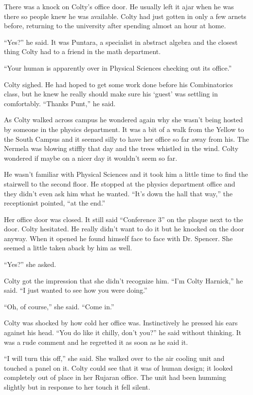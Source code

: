 
There was a knock on Colty's office door. He usually left it ajar when he was there so people
knew he was available. Colty had just gotten in only a few arnets before, returning to the
university after spending almost an hour at home.

``Yes?'' he said. It was Puntara, a specialist in abstract algebra and the closest thing Colty
had to a friend in the math department.

``Your human is apparently over in Physical Sciences checking out its office.''

Colty sighed. He had hoped to get some work done before his Combinatorics class, but he knew he
really should make sure his `guest' was settling in comfortably. ``Thanks Punt,'' he said.

As Colty walked across campus he wondered again why she wasn't being hosted by someone in the
physics department. It was a bit of a walk from the Yellow to the South Campus and it seemed
silly to have her office so far away from his. The Nermela was blowing stiffly that day and the
trees whistled in the wind. Colty wondered if maybe on a nicer day it wouldn't seem so far.

He wasn't familiar with Physical Sciences and it took him a little time to find the stairwell to
the second floor. He stopped at the physics department office and they didn't even ask him what
he wanted. ``It's down the hall that way,'' the receptionist pointed, ``at the end.''

Her office door was closed. It still said ``Conference 3'' on the plaque next to the door. Colty
hesitated. He really didn't want to do it but he knocked on the door anyway. When it opened he
found himself face to face with Dr. Spencer. She seemed a little taken aback by him as well.

``Yes?'' she asked.

Colty got the impression that she didn't recognize him. ``I'm Colty Harnick,'' he said. ``I just
wanted to see how you were doing.''

``Oh, of course,'' she said. ``Come in.''

Colty was shocked by how cold her office was. Instinctively he pressed his ears against his
head. ``You do like it chilly, don't you?'' he said without thinking. It was a rude comment and
he regretted it as soon as he said it.

``I will turn this off,'' she said. She walked over to the air cooling unit and touched a panel
on it. Colty could see that it was of human design; it looked completely out of place in her
Rujaran office. The unit had been humming slightly but in response to her touch it fell silent.

